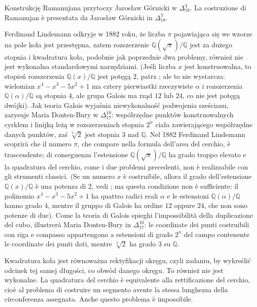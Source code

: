 Konstrukcję Ramanujana przytoczy Jarosław Górnicki w $\Delta_{18}^3$. %
La costruzione di Ramanujan è presentata da Jarosław Górnicki in $\Delta_{18}^3$. %

Ferdinand Lindemann odkryje w 1882 roku, że liczba $\pi$ pojawiająca się we wzorze na pole koła jest przestępna, zatem rozszerzenie $\mathbb Q(\sqrt{\pi}) / \mathbb Q$ jest za dużego stopnia i kwadratura koła, podobnie jak poprzednie dwa problemy, również nie jest wykonalna standardowymi narzędziami. %
(Jeśli liczba $x$ jest konstruowalna, to stopień rozszerzenia $\mathbb Q(x) / \mathbb Q$ jest potęgą $2$, patrz \cite[s. 242]{hartshorne_2000}; ale to nie wystarcza: wielomian $x^4 - x^3 - 5x^2 + 1$ ma cztery pierwiastki rzeczywiste $\alpha$ i rozszerzenia $\mathbb Q(\alpha)/\mathbb Q$ są stopnia $4$, ale grupa Galois ma rząd $12$ lub $24$, co nie jest potęgą dwójki). %
Jak teoria Galois wyjaśnia niewykonalność podwojenia sześcianu, zarysuje Maria Donten-Bury w $\Delta_{17}^{10}$: współrzędne punktów konstruowalnych cyrklem i linijką leżą w rozszerzeniach stopnia $2^n$ ciała zawierającego współrzędne danych punktów, zaś $\sqrt[3]{2}$ jest stopnia $3$ nad $\mathbb Q$. %
Nel 1882 Ferdinand Lindemann scoprirà che il numero $\pi$, che compare nella formula dell'area del cerchio, è trascendente; di conseguenza l'estensione $\mathbb Q(\sqrt{\pi})/\mathbb Q$ ha grado troppo elevato e la quadratura del cerchio, come i due problemi precedenti, non è realizzabile con gli strumenti classici. %
(Se un numero $x$ è costruibile, allora il grado dell'estensione $\mathbb Q(x)/\mathbb Q$ è una potenza di $2$, vedi \cite[p. 242]{hartshorne_2000}; ma questa condizione non è sufficiente: il polinomio $x^4-x^3-5x^2+1$ ha quattro radici reali $\alpha$ e le estensioni $\mathbb Q(\alpha)/\mathbb Q$ hanno grado $4$, mentre il gruppo di Galois ha ordine $12$ oppure $24$, che non sono potenze di due). %
Come la teoria di Galois spieghi l'impossibilità della duplicazione del cubo, illustrerà Maria Donten-Bury in $\Delta_{17}^{10}$: le coordinate dei punti costruibili con riga e compasso appartengono a estensioni di grado $2^n$ del campo contenente le coordinate dei punti dati, mentre $\sqrt[3]{2}$ ha grado $3$ su $\mathbb Q$. %

Kwadratura koła jest równoważna rektyfikacji okręgu, czyli zadaniu, by wykreślić odcinek tej samej długości, co obwód danego okręgu. %
To również nie jest wykonalne. %
La quadratura del cerchio è equivalente alla rettificazione del cerchio, cioè al problema di costruire un segmento avente la stessa lunghezza della circonferenza assegnata. %
Anche questo problema è impossibile. %

%